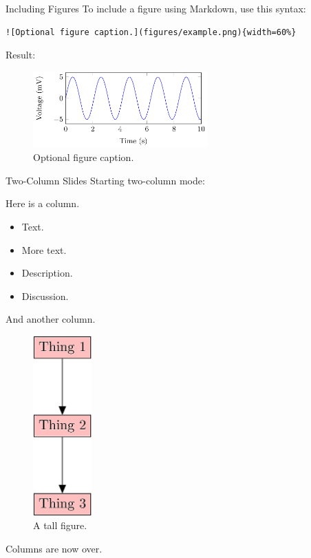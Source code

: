 \documentclass[10pt,ignorenonframetext,]{beamer}
\providecommand{\tightlist}{%
  \setlength{\itemsep}{0pt}\setlength{\parskip}{0pt}}
\begin{document}
\begin{frame}[fragile]{Including Figures}
\protect\hypertarget{including-figures}{}
To include a figure using Markdown, use this syntax:

\begin{verbatim}
![Optional figure caption.](figures/example.png){width=60%}
\end{verbatim}

Result:

\begin{figure}
\centering
\includegraphics[width=0.6\textwidth,height=\textheight]{figures/example.png}
\caption{Optional figure caption.}
\end{figure}
\end{frame}

\begin{frame}{Two-Column Slides}
\protect\hypertarget{two-column-slides}{}
Starting two-column mode:

Here is a column.

\begin{itemize}[<+->]
\tightlist
\item
  Text.
\item
  More text.
\item
  Description.
\item
  Discussion.
\end{itemize}

And another column.

\begin{figure}
\centering
\includegraphics[width=0.2\textwidth,height=\textheight]{figures/tall_figure.png}
\caption{A tall figure.}
\end{figure}

Columns are now over.
\end{frame}
\end{document}

